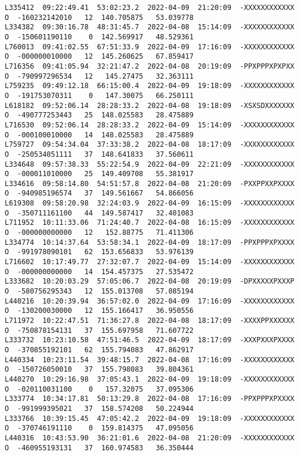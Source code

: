 \documentclass[12pt]{article}
\begin{document}
\begin{verbatim}
L335412  09:22:49.41  53:02:23.2  2022-04-09  21:20:09  -XXXXXXXXXXXX  O  -160232142010   12  140.705875   53.039778
L334382  09:30:16.78  48:31:45.7  2022-04-08  15:14:09  -XXXXXXXXXXXX  O  -150601190110    0  142.569917   48.529361
L760013  09:41:02.55  67:51:33.9  2022-04-09  17:16:09  -XXXXXXXXXXXX  O  -000000010000   12  145.260625   67.859417
L716356  09:41:05.94  32:21:47.2  2022-04-08  20:19:09  -PPXPPPXPXPXX  O  -790997296534   12   145.27475   32.363111
L759235  09:49:12.18  66:15:00.4  2022-04-09  19:18:09  -XXXXXXXXXXXX  O  -191753070311    0   147.30075   66.250111
L618182  09:52:06.14  28:28:33.2  2022-04-08  19:18:09  -XSXSDXXXXXXX  O  -490777253443   25  148.025583   28.475889
L716530  09:52:06.14  28:28:33.2  2022-04-09  15:14:09  -XXXXXXXXXXXX  O  -000100010000   14  148.025583   28.475889
L759727  09:54:34.04  37:33:38.2  2022-04-08  18:17:09  -XXXXXXXXXXXX  O  -250534051111   37  148.641833   37.560611
L334648  09:57:38.33  55:22:54.9  2022-04-09  22:21:09  -XXXXXXXXXXXX  O  -000011010000   25  149.409708   55.381917
L334616  09:58:14.80  54:51:57.8  2022-04-08  21:20:09  -PXXPPXXPXXXX  O  -940985196574   37  149.561667   54.866056
L619308  09:58:20.98  32:24:03.9  2022-04-09  16:15:09  -XXXXXXXXXXXX  O  -350711161100   44  149.587417   32.401083
L711952  10:11:33.06  71:24:40.7  2022-04-08  16:15:09  -XXXXXXXXXXXX  O  -000000000000   12   152.88775   71.411306
L334774  10:14:37.64  53:58:34.1  2022-04-09  18:17:09  -PPXPPPXPXXXX  O  -991978090101   62  153.656833   53.976139
L716602  10:17:49.77  27:32:07.7  2022-04-09  15:14:09  -XXXXXXXXXXXX  O  -000000000000   14  154.457375   27.535472
L333682  10:20:03.29  57:05:06.7  2022-04-08  20:19:09  -DPXXXXXPXXXP  O  -580756295343   12  155.013708   57.085194
L440216  10:20:39.94  36:57:02.0  2022-04-09  17:16:09  -XXXXXXXXXXXX  O  -130200030000   12  155.166417   36.950556
L711972  10:22:47.51  71:36:27.8  2022-04-08  18:17:09  -XXXXPPXXXXXX  O  -750878154131   37  155.697958   71.607722
L333732  10:23:10.58  47:51:46.5  2022-04-09  18:17:09  -XXXPXXXPXXXX  O  -370855192101   62  155.794083   47.862917
L440334  10:23:11.54  39:48:15.7  2022-04-08  17:16:09  -XXXXXXXXXXXX  O  -150726050010   37  155.798083   39.804361
L440270  10:29:16.98  37:05:43.1  2022-04-09  19:18:09  -XXXXXXXXXXXX  O  -020110031100    0   157.32075   37.095306
L333774  10:34:17.81  50:13:29.8  2022-04-08  17:16:09  -PPXPPPXPXXXX  O  -991999395021   37  158.574208   50.224944
L333766  10:39:15.45  47:05:42.2  2022-04-09  19:18:09  -XXXXXXXXXXXX  O  -370746191110    0  159.814375   47.095056
L440316  10:43:53.90  36:21:01.6  2022-04-08  21:20:09  -XXXXXXXXXXXX  O  -460955193131   37  160.974583   36.350444

\end{verbatim}
\end{document}
